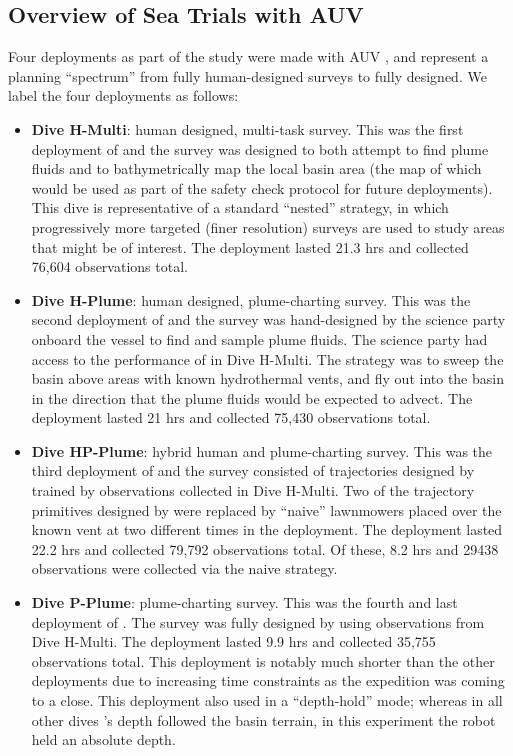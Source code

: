 \subsection{Overview of Sea Trials with AUV \Sentry}
Four deployments as part of the \PHORTEX study were made with AUV \Sentry, and represent a planning ``spectrum'' from fully human-designed surveys to fully \PHORTEX designed. We label the four deployments as follows:
\begin{itemize}
    \item \textbf{Dive H-Multi}: human designed, multi-task survey. This was the first deployment of \Sentry and the survey was designed to both attempt to find plume fluids and to bathymetrically map the local basin area (the map of which would be used as part of the safety check protocol for future deployments). This dive is representative of a standard ``nested'' strategy, in which progressively more targeted (finer resolution) surveys are used to study areas that might be of interest. The deployment lasted 21.3 hrs and collected 76,604 observations total.
    \item \textbf{Dive H-Plume}: human designed, plume-charting survey. This was the second deployment of \Sentry and the survey was hand-designed by the science party onboard the vessel to find and sample plume fluids. The science party had access to the performance of \Sentry in Dive H-Multi. The strategy was to sweep the basin above areas with known hydrothermal vents, and fly out into the basin in the direction that the plume fluids would be expected to advect. The deployment lasted 21 hrs and collected 75,430 observations total.
    \item \textbf{Dive HP-Plume}: hybrid human and \PHORTEX plume-charting survey. This was the third deployment of \Sentry and the survey consisted of trajectories designed by \PHORTEX trained by observations collected in Dive H-Multi. Two of the trajectory primitives designed by \PHORTEX were replaced by ``naive'' lawnmowers placed over the known vent at two different times in the deployment. The deployment lasted 22.2 hrs and collected 79,792 observations total. Of these, 8.2 hrs and 29438 observations were collected via the naive strategy.
    \item \textbf{Dive P-Plume}: \PHORTEX plume-charting survey. This was the fourth and last deployment of \Sentry. The survey was fully designed by \PHORTEX using observations from Dive H-Multi. The deployment lasted 9.9 hrs and collected 35,755 observations total. This deployment is notably much shorter than the other deployments due to increasing time constraints as the expedition was coming to a close. This deployment also used \Sentry in a ``depth-hold'' mode; whereas in all other dives \Sentry's depth followed the basin terrain, in this experiment the robot held an absolute depth.
\end{itemize}

